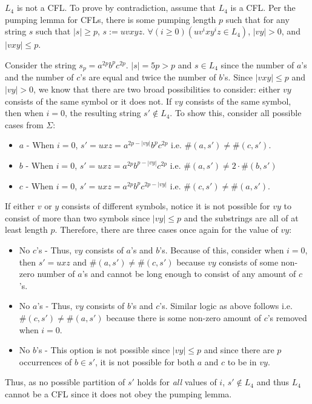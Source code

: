 \documentclass{article}
\begin{document}
\newpage

\section{}
$L_4$ is not a CFL. To prove by contradiction, assume that $L_4$ is a CFL. Per the pumping lemma for CFLs, there is some pumping length $p$ such that for any string $s$ such that $|s| \geq p$, $s := uvxyz$. $\forall{(i \geq 0)} (uv^ixy^iz \in L_4)$, $|vy| > 0$, and $|vxy| \leq p$.

\noindent
Consider the string $s_p = a^{2p}b^pc^{2p}$. $|s| = 5p > p$ and $s \in L_4$ since the number of $a$'s and the number of $c$'s are equal and twice the number of $b$'s. Since $|vxy| \leq p$ and $|vy| > 0$, we know that there are two broad possibilities to consider: either $vy$ consists of the same symbol or it does not. If $vy$ consists of the same symbol, then when $i = 0$, the resulting string $s' \not\in L_4$. To show this, consider all possible cases from $\Sigma$:

\begin{itemize}
    \item $a$ - When $i = 0$, $s' = uxz = a^{2p - |vy|}b^pc^{2p}$ i.e. $\#(a,s') \neq \#(c, s')$.
    \item $b$ - When $i = 0$, $s' = uxz = a^{2p}b^{p - |vy|}c^{2p}$ i.e. $\#(a, s') \neq 2 \cdot \#(b,s')$
    \item $c$ - When $i = 0$, $s' = uxz = a^{2p}b^pc^{2p - |vy|}$ i.e. $\#(c,s') \neq \#(a, s')$.
\end{itemize}

\noindent
If either $v$ or $y$ consists of different symbols, notice it is not possible for $vy$ to consist of more than two symbols since $|vy| \leq p$ and the substrings are all of at least length $p$. Therefore, there are three cases once again for the value of $vy$:

\begin{itemize}
    \item No $c$'s - Thus, $vy$ consists of $a$'s and $b$'s. Because of this, consider when $i = 0$, then $s' = uxz$ and $\#(a,s') \neq \#(c,s')$ because $vy$ consists of some non-zero number of $a$'s and cannot be long enough to consist of any amount of $c$'s.
    \item No $a$'s - Thus, $vy$ consists of $b$'s and $c$'s. Similar logic as above follows i.e. $\#(c,s') \neq \#(a,s')$ because there is some non-zero amount of $c$'s removed when $i = 0$.
    \item No $b$'s - This option is not possible since $|vy| \leq p$ and since there are $p$ occurrences of $b \in s'$, it is not possible for both $a$ and $c$ to be in $vy$.
\end{itemize}

\noindent
Thus, as no possible partition of $s'$ holds for \textit{all} values of $i$, $s' \not\in L_4$ and thus $L_4$ cannot be a CFL since it does not obey the pumping lemma.
\end{document}
